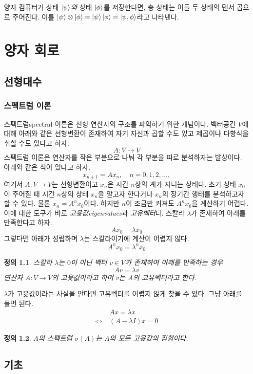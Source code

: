 \documentclass[a4paper,chapter,atbegshi]{oblivoir}
\newtheorem{defn}{정의}[chapter]
\begin{document}
양자 컴퓨터가 상태 $\ket{\psi}$\emph{와} 상태 $\ket{\phi}$를 저장한다면, 총
상태는 이들 두 상태의 텐서 곱으로 주어진다. 이를 $\ket{\psi}\otimes\ket{\phi}=
\ket{\psi}\ket{\phi}=\ket{\psi,\phi}$라고 나타낸다. 
\part{양자 회로}\label{part:1}
\chapter{선형대수}
\section{스펙트럼 이론}
스펙트럼{\footnotesize spectral} 이론은 선형 연산자의 구조를 파악하기 위한
개념이다. 벡터공간 $V$에 대해 아래와 같은 선형변환이 존재하여 자기 자신과
곱할 수도 있고 제곱이나 다항식을 취할 수도 있다고 하자.
\[
  A:V\rightarrow V
\]
스펙트럼 이론은 연산자를 작은 부분으로 나눠 각 부분을 따로 분석하자는 발상이다.
아래와 같은 식이 있다고 하자.
\[
  x_{n+1}=Ax_n,\quad n=0,1,2,\ldots,
\]
여기서 $A:V\rightarrow V$는 선형변환이고 $x_n$은 시간 $n$상의 계가 지니는 상태다.
초기 상태 $x_0$이 주어질 때 시간 $n$상의 상태 $x_n$을 알고자 한다거나
$x_n$의 장기간 행태를 분석하고자 할 수 있다. 물론 $x_n=A^n x_0$이다.
하지만 $n$이 조금만 커져도 $A^n x_0$을 계산하기 어렵다. 이에 대한 도구가
바로 \emph{고윳값\footnotesize eigenvalues}과 \emph{고유벡터}다. 스칼라
$\lambda$가 존재하여 아래를 만족한다고 하자.
\[
  Ax_0=\lambda x_0
\]
그렇다면 아래가 성립하며 $\lambda$는 스칼라이기에 계산이 어렵지 않다.
\[
  A^nx_0=\lambda^nx_0
\]
\begin{defn}\normalfont
  스칼라 $\lambda$는 $0$이 아닌 벡터 $v\in V$가 존재하여 아래를 만족하는 경우
  \[
    Av=\lambda v
  \]
  연산자 $A:V\rightarrow V$의 \emph{고윳값}이라고 하며 $v$는 $A$의 
  \emph{고유벡터}라고 한다.
\end{defn}
$\lambda$가 고윳값이라는 사실을 안다면 고유벡터를 어렵지 않게 찾을 수 있다.
그냥 아래를 풀면 된다.
\begin{align*}
  \;& Ax=\lambda x \\
  \Leftrightarrow\; &(A-\lambda I)x=0
\end{align*}
\begin{defn}\normalfont
  $A$의 \emph{스펙트럼} $\sigma(A)$는 $A$의 모든 고윳값의 집합이다.
\end{defn}
\chapter{기초}
\end{document}
